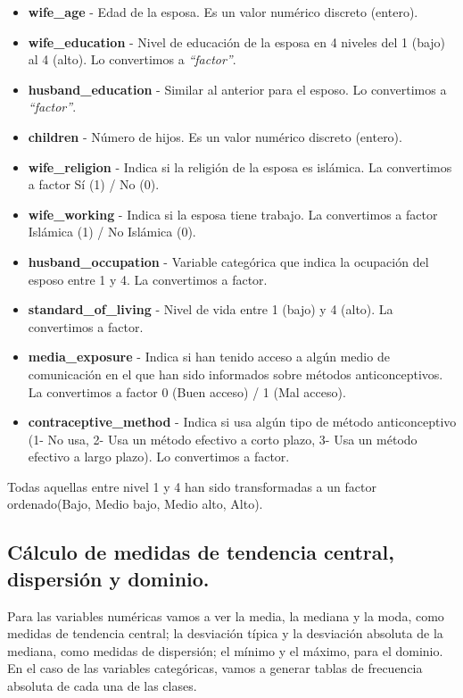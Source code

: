 \documentclass[a4paper,12pt, oneside]{book}
\begin{document}
\begin{itemize}
	\item \textbf{wife\_age} - Edad de la esposa. Es un valor numérico discreto (entero).
    \item \textbf{wife\_education} - Nivel de educación de la esposa en 4 niveles del 1 (bajo) al 4 (alto). Lo convertimos a \textit{``factor''}.
    \item \textbf{husband\_education} - Similar al anterior para el esposo. Lo convertimos a \textit{``factor''}.
    \item \textbf{children} - Número de hijos. Es un valor numérico discreto (entero).
    \item \textbf{wife\_religion} - Indica si la religión de la esposa es islámica. La convertimos a factor Sí (1) / No (0).
    \item \textbf{wife\_working} - Indica si la esposa tiene trabajo. La convertimos a factor Islámica (1) / No Islámica (0).
    \item \textbf{husband\_occupation} - Variable categórica que indica la ocupación del esposo entre 1 y 4. La convertimos a factor.
    \item \textbf{standard\_of\_living} - Nivel de vida entre 1 (bajo) y 4 (alto). La convertimos a factor.
    \item \textbf{media\_exposure} - Indica si han tenido acceso a algún medio de comunicación en el que han sido informados sobre métodos anticonceptivos. La convertimos a factor 0 (Buen acceso) / 1 (Mal acceso).
    \item \textbf{contraceptive\_method} - Indica si usa algún tipo de método anticonceptivo (1- No usa, 2- Usa un método efectivo a corto plazo, 3- Usa un método efectivo a largo plazo). Lo convertimos a factor.
\end{itemize}

Todas aquellas entre nivel 1 y 4 han sido transformadas a un factor ordenado(Bajo, Medio bajo, Medio alto, Alto).

\subsection{Cálculo de medidas de tendencia central, dispersión y dominio.}
Para las variables numéricas vamos a ver la media, la mediana y la moda, como medidas de tendencia central; la desviación típica y la desviación absoluta de la mediana, como medidas de dispersión; el mínimo y el máximo, para el dominio. En el caso de las variables categóricas, vamos a generar tablas de frecuencia absoluta de cada una de las clases.\\
\end{document}
